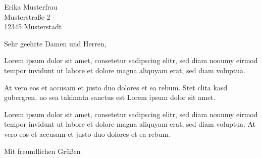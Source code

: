 \documentclass[
	a4paper,
	fromalign=left, %
	fromlogo=true,  %
	fromphone=true,
	fromfax=true,
	fromemail=true,
	fromurl=true,
	fromrule=false, %
	locfield=wide,
	foldmarks=on,   %
	parskip=full,   %
	version=2.9t    %
]{scrlttr2}
\begin{document}
\begin{letter}{Erika Musterfrau\\
               Musterstraße 2\\
               12345 Musterstadt}

\opening{Sehr geehrte Damen und Herren,}

Lorem ipsum dolor sit amet, consetetur sadipscing elitr, sed diam nonumy eirmod 
tempor invidunt ut labore et dolore magna aliquyam erat, sed diam voluptua. 

At vero eos et accusam et justo duo dolores et ea rebum. Stet clita kasd 
gubergren, no sea takimata sanctus est Lorem ipsum dolor sit amet. 

Lorem ipsum dolor sit amet, consetetur sadipscing elitr, sed diam nonumy eirmod 
tempor invidunt ut labore et dolore magna aliquyam erat, sed diam voluptua. At 
vero eos et accusam et justo duo dolores et ea rebum.

\closing{Mit freundlichen Grüßen}



\end{letter}
\end{document}
